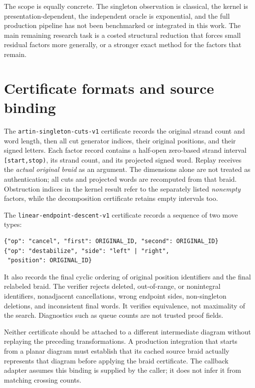 \documentclass[11pt,letterpaper]{article}
\theoremstyle{definition}
\begin{document}
The scope is equally concrete. The singleton observation is classical, the kernel is presentation-dependent, the independent oracle is exponential, and the full production pipeline has not been benchmarked or integrated in this work. The main remaining research task is a costed structural reduction that forces small residual factors more generally, or a stronger exact method for the factors that remain.

\appendix
\section{Certificate formats and source binding}
\label{app:certificates}

The \texttt{artin-singleton-cuts-v1} certificate records the original strand count and word length, then all cut generator indices, their original positions, and their signed letters. Each factor record contains a half-open zero-based strand interval \texttt{[start,stop)}, its strand count, and its projected signed word. Replay receives the \emph{actual original braid} as an argument. The dimensions alone are not treated as authentication; all cuts and projected words are recomputed from that braid. Obstruction indices in the kernel result refer to the separately listed \emph{nonempty} factors, while the decomposition certificate retains empty intervals too.

The \texttt{linear-endpoint-descent-v1} certificate records a sequence of two move types:
\begin{verbatim}
{"op": "cancel", "first": ORIGINAL_ID, "second": ORIGINAL_ID}
{"op": "destabilize", "side": "left" | "right",
 "position": ORIGINAL_ID}
\end{verbatim}
It also records the final cyclic ordering of original position identifiers and the final relabeled braid. The verifier rejects deleted, out-of-range, or nonintegral identifiers, nonadjacent cancellations, wrong endpoint sides, non-singleton deletions, and inconsistent final words. It verifies equivalence, not maximality of the search. Diagnostics such as queue counts are not trusted proof fields.

Neither certificate should be attached to a different intermediate diagram without replaying the preceding transformations. A production integration that starts from a planar diagram must establish that its cached source braid actually represents that diagram before applying the braid certificate. The callback adapter assumes this binding is supplied by the caller; it does not infer it from matching crossing counts.
\end{document}
